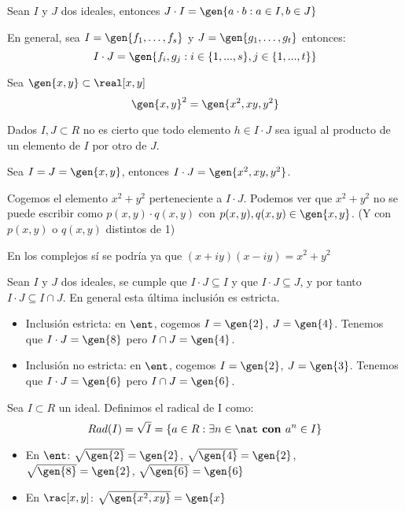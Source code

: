 \begin{defn}
	Sean $I$ y $J$ dos ideales, entonces $J\cdot I = \gen{a\cdot b: a \in I, b \in J}$

	En general, sea $I=\gen{f_1,\dotsc ,f_s}$ y $J=\gen{g_1,\dotsc,g_t}$ entonces:
	$$I\cdot J=\gen{ f_i, g_j: i \in \{1,...,s\}, j \in \{1,...,t\}}$$
\end{defn}

\begin{example} Sea $\gen{x,y} \subset \real[x,y]$
	$$\gen{x,y}^2 = \gen{x^2,xy,y^2}$$
\end{example}

\obs Dados $I,J \subset R$ no es cierto que todo elemento $h \in I\cdot J$ sea igual al producto de un elemento de $I$ por otro de $J$.

\begin{example}
	Sea $I=J=\gen{x,y}$, entonces $I\cdot J = \gen{x^2,xy,y^2}$.

	Cogemos el elemento $x^2 + y^2$ perteneciente a $I\cdot J$. Podemos ver que $x^2 + y^2$ no se puede escribir como $p(x,y) \cdot q(x,y)$ con $p(x,y),q(x,y) \in \gen{x,y}$. (Y con $p(x,y)$ o $q(x,y)$ distintos de 1)

	\obs En los complejos sí se podría ya que $(x+iy)(x-iy)=x^2 + y^2$
\end{example}

\obs Sean $I$ y $J$ dos ideales, se cumple que $I\cdot J \subseteq I$ y que $I \cdot J \subseteq J$, y por tanto $I \cdot J \subseteq I \cap J$. En general esta última inclusión es estricta.

\begin{example}
	\begin{itemize}
\item Inclusión estricta: en $\ent$, cogemos $I=\gen{2}$, $J=\gen{4}$. Tenemos que $I\cdot J=\gen{8}$ pero $I\cap J=\gen{4}$.
\item Inclusión no estricta: en $\ent$, cogemos $I=\gen{2}$, $J=\gen{3}$. Tenemos que $I\cdot J=\gen{6}$ pero $I\cap J=\gen{6}$.
	\end{itemize}
\end{example}

\begin{defn}
Sea $I \subset R$ un ideal. Definimos el radical de I como:
$$Rad(I)=\sqrt{I}=\{a \in R: \exists n \in \nat \textbf{ con } a^n \in I \}$$
\end{defn}

\begin{example}
\begin{itemize}
	\item En $\ent$: $\sqrt{\gen{2}}=\gen{2}$, $\sqrt{\gen{4}}=\gen{2}$, $\sqrt{\gen{8}}=\gen{2}$, $\sqrt{\gen{6}}=\gen{6}$
	\item En $\rac[x,y]$: $\sqrt{\gen{x^2,xy}}=\gen{x}$
\end{itemize}
\end{example}


